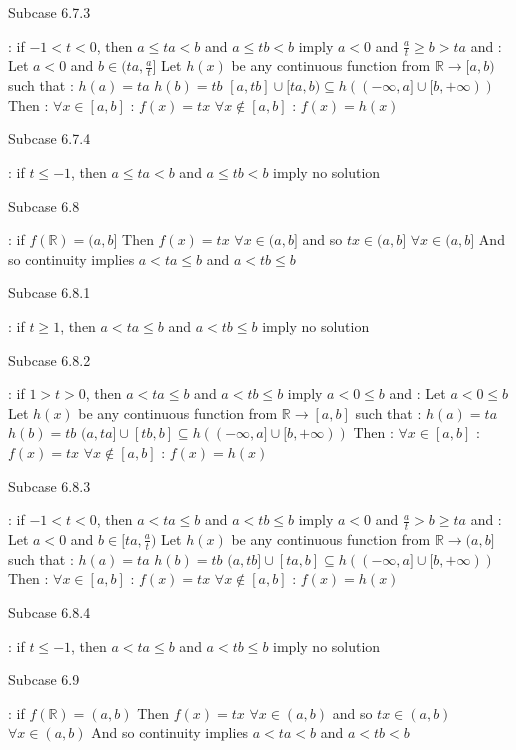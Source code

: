 \begin{solution}
\begin{bolded}Subcase 6.7.3\end{bolded} : if $-1< t<0$, then $a\le ta< b$ and $a\le tb< b$ imply $a<0$ and $\frac at\ge b> ta$ and :
Let $a<0$ and $b\in(ta,\frac at]$
Let $h(x)$ be any continuous function from $\mathbb R\to[a,b)$ such that :
$h(a)=ta$
$h(b)=tb$
$[a,tb]\cup[ta,b)\subseteq h((-\infty,a]\cup[b,+\infty))$
Then :
$\forall x\in[a,b]$ : $f(x)=tx$
$\forall x\notin[a,b]$ : $f(x)=h(x)$

\begin{bolded}Subcase 6.7.4\end{bolded} : if $t\le -1$, then $a\le ta< b$ and $a\le tb< b$ imply no solution

\begin{bolded}Subcase 6.8\end{bolded} : if $f(\mathbb R)=(a,b]$
Then $f(x)=tx$ $\forall x\in (a,b]$ and so $tx\in(a,b]$ $\forall x\in(a,b]$
And so continuity implies $a< ta\le b$ and $a< tb\le b$

\begin{bolded}Subcase 6.8.1\end{bolded} : if $t\ge 1$, then $a< ta\le b$ and $a< tb\le b$ imply no solution

\begin{bolded}Subcase 6.8.2\end{bolded} : if $1>t>0$, then $a< ta\le b$ and $a< tb\le b$ imply $a<0\le b$ and :
Let $a< 0\le b$
Let $h(x)$ be any continuous function from $\mathbb R\to[a,b]$ such that :
$h(a)=ta$
$h(b)=tb$
$(a,ta]\cup[tb,b]\subseteq h((-\infty,a]\cup[b,+\infty))$
Then :
$\forall x\in[a,b]$ : $f(x)=tx$
$\forall x\notin[a,b]$ : $f(x)=h(x)$

\begin{bolded}Subcase 6.8.3\end{bolded} : if $-1<t<0$, then $a< ta\le b$ and $a< tb\le b$ imply $a< 0$ and $\frac at> b\ge ta$ and :
Let $a< 0$ and $b\in[ta,\frac at)$
Let $h(x)$ be any continuous function from $\mathbb R\to(a,b]$ such that :
$h(a)=ta$
$h(b)=tb$
$(a,tb]\cup[ta,b]\subseteq h((-\infty,a]\cup[b,+\infty))$
Then :
$\forall x\in[a,b]$ : $f(x)=tx$
$\forall x\notin[a,b]$ : $f(x)=h(x)$

\begin{bolded}Subcase 6.8.4\end{bolded} : if $t\le -1$, then $a< ta\le b$ and $a< tb\le b$ imply no solution

\begin{bolded}Subcase 6.9\end{bolded} : if $f(\mathbb R)=(a,b)$
Then $f(x)=tx$ $\forall x\in (a,b)$ and so $tx\in(a,b)$ $\forall x\in(a,b)$
And so continuity implies $a< ta< b$ and $a< tb< b$


\end{solution}
